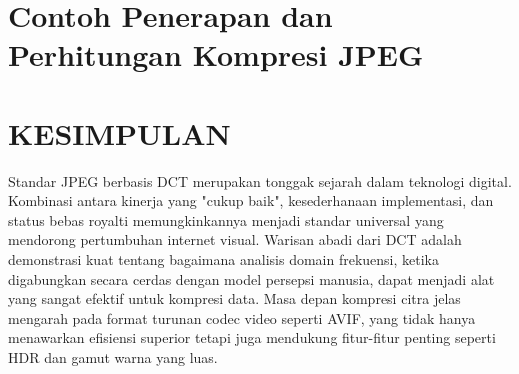 \documentclass[a4paper]{article}
\begin{document}
\section{Contoh Penerapan dan Perhitungan Kompresi JPEG}


\section{KESIMPULAN}
Standar JPEG berbasis DCT merupakan tonggak sejarah dalam teknologi digital. Kombinasi antara kinerja yang "cukup baik", kesederhanaan implementasi, dan status bebas royalti memungkinkannya menjadi standar universal yang mendorong pertumbuhan internet visual. Warisan abadi dari DCT adalah demonstrasi kuat tentang bagaimana analisis domain frekuensi, ketika digabungkan secara cerdas dengan model persepsi manusia, dapat menjadi alat yang sangat efektif untuk kompresi data. Masa depan kompresi citra jelas mengarah pada format turunan codec video seperti AVIF, yang tidak hanya menawarkan efisiensi superior tetapi juga mendukung fitur-fitur penting seperti HDR dan gamut warna yang luas.

\printbibliography
\end{document}
